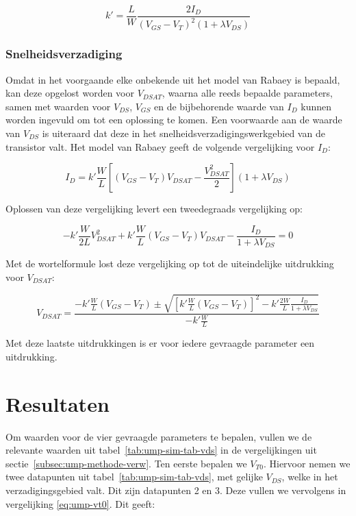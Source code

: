 \documentclass{article}
\begin{document}
\begin{equation} \label{eq:ump-kprime}
	k' = \frac{L}{W}\frac{2I_{D}}{(V_{GS} - V_{T})^2(1 + \lambda V_{DS})}
\end{equation}

\subsubsection{Snelheidsverzadiging}
\label{subsubsec:ump-methode-verw-vdsat}
Omdat in het voorgaande elke onbekende uit het model van Rabaey is bepaald, kan deze opgelost worden voor $V_{DSAT}$, waarna alle reeds bepaalde parameters, samen met waarden voor $V_{DS}$, $V_{GS}$ en de bijbehorende waarde van $I_{D}$ kunnen worden ingevuld om tot een oplossing te komen. Een voorwaarde aan de waarde van $V_{DS}$ is uiteraard dat deze in het snelheidsverzadigingswerkgebied van de transistor valt. Het model van Rabaey geeft de volgende vergelijking voor $I_{D}$:

\begin{equation}
	I_{D} = k' \frac{W}{L}[(V_{GS} - V_{T})V_{DSAT} - \frac{V_{DSAT}^2}{2}](1 + \lambda V_{DS})
\end{equation}

Oplossen van deze vergelijking levert een tweedegraads vergelijking op:

$$-k'\frac{W}{2L}V_{DSAT}^2 + k'\frac{W}{L}(V_{GS}-V_{T})V_{DSAT} - \frac{I_{D}}{1 + \lambda V_{DS}} = 0$$

Met de wortelformule lost deze vergelijking op tot de uiteindelijke uitdrukking voor $V_{DSAT}$:

\begin{equation} \label{eq:ump-vdsat}
	V_{DSAT} = \frac{-k'\frac{W}{L}(V_{GS}-V_{T}) \pm \sqrt{[k'\frac{W}{L}(V_{GS}-V_{T})]^2 - k'\frac{2W}{L}\frac{I_{D}}{1 + \lambda V_{DS}}}}{-k'\frac{W}{L}}
\end{equation}

Met deze laatste uitdrukkingen is er voor iedere gevraagde parameter een uitdrukking.

\section{Resultaten}
\label{sec:ump-res}
Om waarden voor de vier gevraagde parameters te bepalen, vullen we de relevante waarden uit tabel~\ref{tab:ump-sim-tab-vds} in de vergelijkingen uit sectie~\ref{subsec:ump-methode-verw}.
Ten eerste bepalen we $V_{T0}$. Hiervoor nemen we twee datapunten uit tabel~\ref{tab:ump-sim-tab-vds}, met gelijke $V_{DS}$, welke in het verzadigingsgebied valt. Dit zijn datapunten 2 en 3. Deze vullen we vervolgens in vergelijking \ref{eq:ump-vt0}. Dit geeft:
\end{document}
